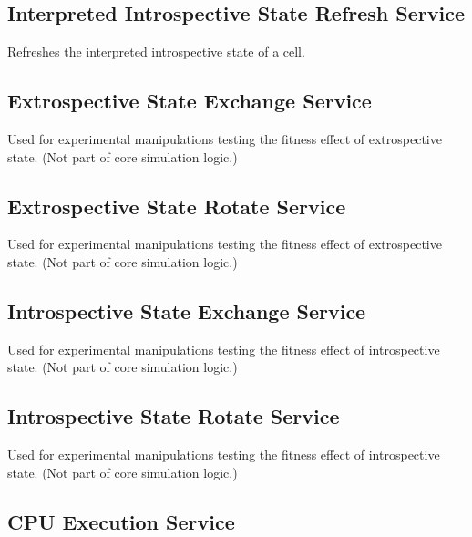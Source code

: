 \subsection{Interpreted Introspective State Refresh Service}


Refreshes the interpreted introspective state of a cell.

\subsection{Extrospective State Exchange Service}


Used for experimental manipulations testing the fitness effect of extrospective state.
(Not part of core simulation logic.)

\subsection{Extrospective State Rotate Service}


Used for experimental manipulations testing the fitness effect of extrospective state.
(Not part of core simulation logic.)

\subsection{Introspective State Exchange Service}


Used for experimental manipulations testing the fitness effect of introspective state.
(Not part of core simulation logic.)

\subsection{Introspective State Rotate Service}


Used for experimental manipulations testing the fitness effect of introspective state.
(Not part of core simulation logic.)

\subsection{CPU Execution Service}


